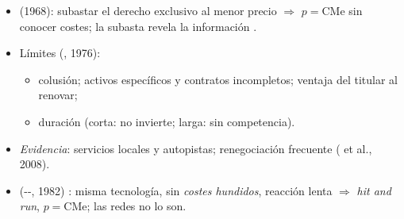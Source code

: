 \documentclass{article}
\begin{document}
\begin{columnas}
\begin{itemize}
\item {} (1968): subastar el derecho exclusivo al menor precio $\Rightarrow$ $p=\mathrm{CMe}$ sin conocer costes; la subasta revela la información .
\item Límites (, 1976):
  \begin{itemize}
  \item colusión; activos específicos y contratos incompletos; ventaja del titular al renovar;
  \item duración (corta: no invierte; larga: sin competencia).
  \end{itemize}
\item \emph{Evidencia}: servicios locales y autopistas; renegociación frecuente ( et al., 2008).
\item {} (--, 1982) : misma tecnología, sin \emph{costes hundidos}, reacción lenta $\Rightarrow$ \emph{hit and run}, $p=\mathrm{CMe}$; las redes no lo son.
\end{itemize}


\end{columnas}
\end{document}
